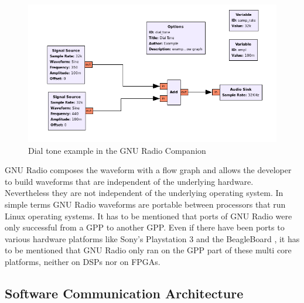\begin{figure}[htbp]
	\centering
		\includegraphics[width=1.00\textwidth]{../kapitel02/figures/gnuradio_grc.png}
	\caption{Dial tone example in the GNU Radio Companion}
	\label{fig:gnuradio_grc}
\end{figure}

GNU Radio composes the waveform with a flow graph and allows the developer to build waveforms that are independent of the underlying hardware. Nevertheless they are not independent of the underlying operating system. In simple terms GNU Radio waveforms are portable between processors that run Linux operating systems. It has to be mentioned that ports of GNU Radio were only successful from a GPP to another GPP. Even if there have been ports to various hardware platforms like Sony's Playstation 3 \cite{gnu_radio_web} and the BeagleBoard \cite{open_sdr}, it has to be mentioned that GNU Radio only ran on the GPP part of these multi core platforms, neither on DSPs nor on FPGAs.


\subsection{Software Communication Architecture}
\label{sec:SCA}

